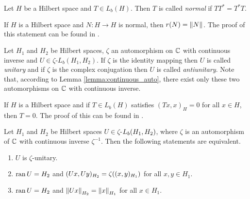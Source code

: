 \begin{definition}
	Let $H$ be a Hilbert space and $T\in L_b(H)$. Then $T$ is called \textit{normal} if $TT^\ast = T^\ast T$. 
\end{definition}


\begin{remark} \label{remark:spectral_radius}
	If $H$ is a Hilbert space and $N: H \to H$ is normal, then $r(N) = \norm{N}$. The proof of this statement can be found in \cite[p.142]{FAna1}.
\end{remark}


\begin{definition}
	Let $H_1$ and $H_2$ be Hilbert spaces, $\zeta$ an automorphism on $\C$ with continuous inverse and $U \in \zeta$-$L_b(H_1, H_2)$. If $\zeta$ is the identity mapping then $U$ is called \textit{unitary} and if $\zeta$ is the complex conjugation then $U$ is called \textit{antiunitary}. Note that, according to Lemma \ref{lemma:continuous_auto}, there exist only these two automorphisms on $\C$ with continuous inverse.
\end{definition}


\begin{remark}\label{remark:operator_equivalence_hilbert}
		If $H$ is a Hilbert space and if $T\in L_b(H)$ satisfies $(Tx,x)_H = 0$ for all $x \in H$, then $T = 0$. The proof of this can be found in \cite[p.142]{FAna1}.
\end{remark}


\begin{proposition} \label{prop:unitary}
	Let $H_1$ and $H_2$ be Hilbert spaces $U \in \zeta$-$L_b\pbraces{H_1, H_2}$, where $\zeta$ is an automorphism of $\C$ with continuous inverse $\zeta^{-1}$. Then the following statements are equivalent.
	\begin{enumerate}[label = (\roman*)]
		\item $U$ is $\zeta$-unitary. 
		\item $\ran U = H_2$ and $(Ux , Uy)_{H_2} = \zeta\pbraces{(x,y)_{H_1}}$ for all $x,y \in H_1$.
		\item $\ran U = H_2$ and $\norm[H_2]{Ux} = \norm[H_1]{x}$ for all $x \in H_1$. 
	\end{enumerate}
\end{proposition}

